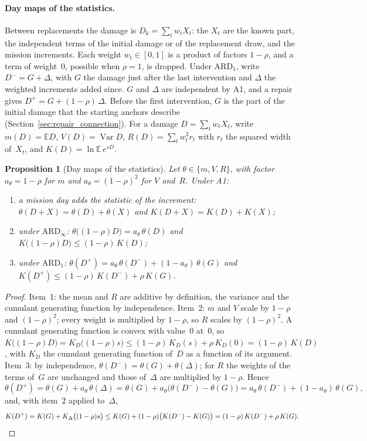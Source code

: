 \documentclass[11pt,a4paper]{article}
\theoremstyle{plain}
\newtheorem{proposition}[theorem]{Proposition}
\theoremstyle{definition}
\theoremstyle{remark}
\begin{document}
\paragraph{Day maps of the statistics.}
Between replacements the damage is $D_k = \sum_t w_t X_t$: the $X_t$ are the known part, the independent terms of the initial damage or of the replacement draw, and the mission increments.
Each weight $w_t \in [0, 1]$ is a product of factors $1 - \rho$, and a term of weight~$0$, possible when $\rho = 1$, is dropped.
Under $\text{ARD}_1$, write $D^- = G + \Delta$, with $G$ the damage just after the last intervention and $\Delta$ the weighted increments added since.
$G$ and $\Delta$ are independent by A1, and a repair gives $D^+ = G + (1-\rho)\,\Delta$.
Before the first intervention, $G$ is the part of the initial damage that the starting anchors describe (Section~\ref{sec:repair_connection}).
For a damage $D = \sum_t w_t X_t$, write $m(D) = \mathbb{E}D$, $V(D) = \operatorname{Var} D$, $R(D) = \sum_t w_t^2 r_t$ with $r_t$ the squared width of~$X_t$, and $K(D) = \ln\mathbb{E}\,e^{sD}$.

\begin{proposition}[Day maps of the statistics]\label{prop:rf_maps}
Let $\theta \in \{m, V, R\}$, with factor $a_\theta = 1-\rho$ for $m$ and $a_\theta = (1-\rho)^2$ for $V$ and~$R$.
Under A1:
\begin{enumerate}[nosep]
  \item a mission day adds the statistic of the increment: $\theta(D + X) = \theta(D) + \theta(X)$ and $K(D + X) = K(D) + K(X)$;
  \item under $\text{ARD}_\infty$: $\theta\bigl((1-\rho)D\bigr) = a_\theta\,\theta(D)$ and $K\bigl((1-\rho)D\bigr) \le (1-\rho)\,K(D)$;
  \item under $\text{ARD}_1$: $\theta(D^+) = a_\theta\,\theta(D^-) + (1 - a_\theta)\,\theta(G)$ and $K(D^+) \le (1-\rho)\,K(D^-) + \rho\,K(G)$.
\end{enumerate}
\end{proposition}
\begin{proof}
Item~1: the mean and $R$ are additive by definition, the variance and the cumulant generating function by independence.
Item~2: $m$ and $V$ scale by $1-\rho$ and $(1-\rho)^2$; every weight is multiplied by $1-\rho$, so $R$ scales by $(1-\rho)^2$.
A cumulant generating function is convex with value~$0$ at~$0$, so $K\bigl((1-\rho)D\bigr) = K_D\bigl((1-\rho)s\bigr) \le (1-\rho)\,K_D(s) + \rho\,K_D(0) = (1-\rho)\,K(D)$, with $K_D$ the cumulant generating function of~$D$ as a function of its argument.
Item~3: by independence, $\theta(D^-) = \theta(G) + \theta(\Delta)$; for $R$ the weights of the terms of~$G$ are unchanged and those of~$\Delta$ are multiplied by $1-\rho$.
Hence
\[
  \theta(D^+) = \theta(G) + a_\theta\,\theta(\Delta)
  = \theta(G) + a_\theta\bigl(\theta(D^-) - \theta(G)\bigr)
  = a_\theta\,\theta(D^-) + (1 - a_\theta)\,\theta(G),
\]
and, with item~2 applied to~$\Delta$,
\[
  K(D^+) = K(G) + K_\Delta\bigl((1-\rho)s\bigr)
  \le K(G) + (1-\rho)\bigl(K(D^-) - K(G)\bigr)
  = (1-\rho)\,K(D^-) + \rho\,K(G). \qedhere
\]
\end{proof}
\end{document}
